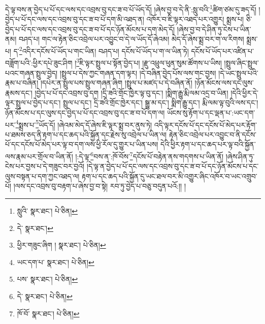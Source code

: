 དེ་ལྟ་བས་ན་བྱེད་པ་པོ་དང་ལས་དང་འབྲས་བུ་དང་ཟ་བ་པོ་ཡོད་དོ། །ཞེས་བྱ་བ་དེ་ནི་:སླུ་བའི་\footnote{སླུའི་  སྣར་ཐང་།  པེ་ཅིན། }ཚིག་ཙམ་དུ་ཟད་དོ། །བྱེད་པ་པོ་དང་ལས་དང་འབྲས་བུ་དང་ཟ་བ་པོ་དག་མི་འཐད་ན། འཁོར་བ་ཇི་ལྟར་འཐད་པར་འགྱུར། སྨྲས་པ། ཅི་བྱེད་པ་པོ་དང་ལས་དང་འབྲས་བུ་དང་ཟ་བ་པོ་དང་ཉོན་མོངས་པ་དག་མེད་དོ། །ཞེས་བྱ་བ་དེ་ཤིན་ཏུ་ངེས་པ་ཡིན་ནམ། བཤད་པ། གང་ལ་རྟེན་ཅིང་འབྲེལ་པར་འབྱུང་བ་དེ་ལ་ཡོད་དོ་ཞེའམ། མེད་དོ་ཞེས་སྨྲ་བར་ག་ལ་རིགས། སྨྲས་པ། ད་\footnote{དེ་  སྣར་ཐང་། }འདིར་དངོས་པོ་ཡོད་པ་གང་ཡིན། བཤད་པ། དངོས་པོ་ཡོད་པ་ག་ལ་ཡིན་ཏེ། དངོས་པོ་ཡོད་པར་འཛིན་པ་བཟློག་པའི་:ཕྱིར་དཔེ་ཟུང་ཤིག །\footnote{ཕྱིར་གཟུང་ཞིག །  སྣར་ཐང་།  པེ་ཅིན། }ཇི་ལྟར་སྤྲུལ་པ་སྟོན་བྱེད་པ། །རྫུ་འཕྲུལ་ཕུན་སུམ་ཚོགས་པ་ཡིས། །སྤྲུལ་ཞིང་སྤྲུལ་པའང་གཞན་སྤྲུལ་བྱེད། །སྤྲུལ་པ་དེས་ཀྱང་གཞན་དག་ལྟར། །དེ་བཞིན་བྱེད་པོས་ལས་གང་བྱས། །དེ་ཡང་སྤྲུལ་པའི་རྣམ་པ་བཞིན། །དཔེར་ན་སྤྲུལ་པས་སྤྲུལ་གཞན་ཞིག །སྤྲུལ་པ་མཛད་པ་དེ་བཞིན་ནོ། །ཉོན་མོངས་ལས་དང་ལུས་རྣམས་དང་། །བྱེད་པ་པོ་དང་འབྲས་བུ་དག །དྲི་ཟའི་གྲོང་ཁྱེར་ལྟ་བུ་དང་། །སྨིག་རྒྱུ་རྨི་ལམ་འདྲ་བ་ཡིན། །དེའི་ཕྱིར་དེ་ལྟར་སྤྲུལ་པ་བྱེད་པ་དང་། སྤྲུལ་པ་དང་། དྲི་ཟའི་གྲོང་ཁྱེར་དང་། སྒྱུ་མ་དང་། སྨིག་རྒྱུ་དང་། རྨི་ལམ་ལྟ་བུའི་ལས་དང་། ཉོན་མོངས་པ་དང་ལུས་དང་བྱེད་པ་པོ་དང་འབྲས་བུ་དང་ཟ་བ་པོ་དག་ལ། ཡོངས་སུ་རྟོག་པ་དང་ལྡན་པ་:ཡང་དག་པར་\footnote{ཡང་དག་པ་  སྣར་ཐང་།  པེ་ཅིན། }སྨྲས་པ་\footnote{པས་  སྣར་ཐང་།  པེ་ཅིན། }ཡོད་དོ། །ཞེའམ་མེད་དོ་ཞེས་ཇི་ལྟར་སྨྲ་བར་ནུས་ཏེ། འདི་ལྟར་དངོས་པོ་དང་དངོས་པོ་མེད་པར་རྟོག་པ་ཐམས་ཅད་ནི་རྟག་པ་དང་ཆད་པའི་སྐྱོན་དང་རྗེས་སུ་འབྲེལ་པ་ཡིན་ལ། རྟེན་ཅིང་འབྲེལ་པར་འབྱུང་བ་ནི་དངོས་པོ་དང་དངོས་པོ་མེད་པར་ལྟ་བ་དག་ལས་ཕྱི་རོལ་དུ་གྱུར་པ་ཡིན་པས། དེའི་ཕྱིར་རྟག་པ་དང་ཆད་པར་ལྟ་བའི་སྐྱོན་ལས་རྣམ་པར་གྲོལ་བ་ཡིན་ནོ། །:དེ་ལྟ་\footnote{དེ་  སྣར་ཐང་།  པེ་ཅིན། }བས་ན་:ཁོ་བོས་\footnote{ཁོ་བོ་  སྣར་ཐང་།  པེ་ཅིན། }དངོས་པོ་བརྟེན་ནས་གདགས་པ་ཡིན་ནོ། །ཞེས་ཤིན་ཏུ་ངེས་པར་བྱས་པ་དེ་གཟུང་བར་བྱའོ། །དེ་ལྟ་ན་བྱེད་པ་པོ་དང་ལས་དང་འབྲས་བུ་དང་ཟ་བ་པོ་དང་ཉོན་མོངས་པ་དང་ལུས་བསྟན་པ་དག་ཀྱང་འཐད་ལ། རྟག་པ་དང་ཆད་པའི་སྐྱོན་དུ་ཡང་ཐལ་བར་མི་འགྱུར་ཞིང་འཁོར་བ་ཡང་འགྲུབ་པོ། །ལས་དང་འབྲས་བུ་བརྟག་པ་ཞེས་བྱ་བ་སྟེ། རབ་ཏུ་བྱེད་པ་བཅུ་བདུན་པའོ:།། །
